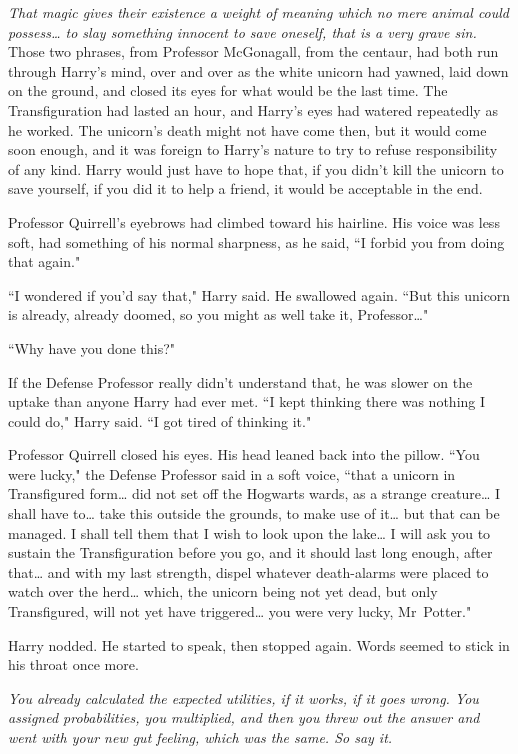 \emph{That magic gives their existence a weight of meaning which no mere animal could possess{\ldots} to slay something innocent to save oneself, that is a very grave sin.} Those two phrases, from Professor McGonagall, from the centaur, had both run through Harry's mind, over and over as the white unicorn had yawned, laid down on the ground, and closed its eyes for what would be the last time. The Transfiguration had lasted an hour, and Harry's eyes had watered repeatedly as he worked. The unicorn's death might not have come then, but it would come soon enough, and it was foreign to Harry's nature to try to refuse responsibility of any kind. Harry would just have to hope that, if you didn't kill the unicorn to save yourself, if you did it to help a friend, it would be acceptable in the end.

Professor Quirrell's eyebrows had climbed toward his hairline. His voice was less soft, had something of his normal sharpness, as he said, ``I forbid you from doing that again."

``I wondered if you'd say that," Harry said. He swallowed again. ``But this unicorn is already, already doomed, so you might as well take it, Professor{\ldots}"

``Why have you done this?"

If the Defense Professor really didn't understand that, he was slower on the uptake than anyone Harry had ever met. ``I kept thinking there was nothing I could do," Harry said. ``I got tired of thinking it."

Professor Quirrell closed his eyes. His head leaned back into the pillow. ``You were lucky," the Defense Professor said in a soft voice, ``that a unicorn in Transfigured form{\ldots} did not set off the Hogwarts wards, as a strange creature{\ldots} I shall have to{\ldots} take this outside the grounds, to make use of it{\ldots} but that can be managed. I shall tell them that I wish to look upon the lake{\ldots} I will ask you to sustain the Transfiguration before you go, and it should last long enough, after that{\ldots} and with my last strength, dispel whatever death-alarms were placed to watch over the herd{\ldots} which, the unicorn being not yet dead, but only Transfigured, will not yet have triggered{\ldots} you were very lucky, Mr~Potter."

Harry nodded. He started to speak, then stopped again. Words seemed to stick in his throat once more.

\emph{You already calculated the expected utilities, if it works, if it goes wrong. You assigned probabilities, you multiplied, and then you threw out the answer and went with your new gut feeling, which was the same. So say it.}

